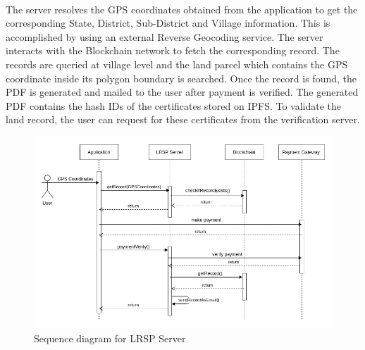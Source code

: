 \documentclass{article}
\begin{document}
        \paragraph{}
        The server resolves the GPS coordinates obtained from the application to get the corresponding State, District, Sub-District and Village information. This is accomplished by using an external Reverse Geocoding service. The server interacts with the Blockchain network to fetch the corresponding record. The records are queried at village level and the land parcel which contains the GPS coordinate inside its polygon boundary is searched. Once the record is found, the PDF is generated and mailed to the user after payment is verified. The generated PDF contains the hash IDs of the certificates stored on IPFS. To validate the land record, the user can request for these certificates from the verification server.
        \begin{figure}[H]
                \includegraphics[scale=0.5]{lrsp_seq.png}
                \centering
                \caption{Sequence diagram for LRSP Server}
        \end{figure}
        
\end{document}
